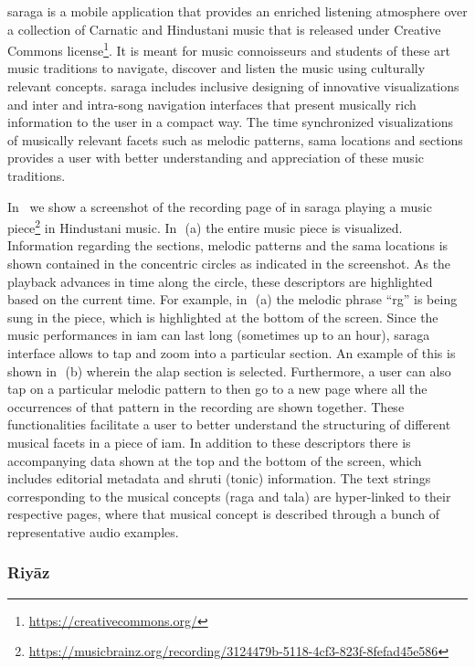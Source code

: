 \Gls{saraga} is a mobile application that provides an enriched listening atmosphere over a collection of Carnatic and Hindustani music that is released under Creative Commons license\footnote{\url{https://creativecommons.org/}}. It is meant for music connoisseurs and students of these art music traditions to navigate, discover and listen the music using culturally relevant concepts. \gls{saraga} includes inclusive designing of innovative visualizations and inter and intra-song navigation interfaces that present musically rich information to the user in a compact way. The time synchronized visualizations of musically relevant facets such as melodic patterns, \gls{sama} locations and sections provides a user with better understanding and appreciation of these music traditions.

In~ we show a screenshot of the recording page of in \gls{saraga} playing a music piece\footnote{\url{https://musicbrainz.org/recording/3124479b-5118-4cf3-823f-8fefad45e586}} in Hindustani music. In~\,(a) the entire music piece is visualized. Information regarding the sections, melodic patterns and the \gls{sama} locations is shown contained in the concentric circles as indicated in the screenshot. As the playback advances in time along the circle, these descriptors are highlighted based on the current time. For example, in~\,(a) the melodic phrase ``rg'' is being sung in the piece, which is highlighted at the bottom of the screen. Since the music performances in \gls{iam} can last long (sometimes up to an hour), \gls{saraga} interface allows to tap and zoom into a particular section. An example of this is shown in~\,(b) wherein the \gls{alap} section is selected. Furthermore, a user can also tap on a particular melodic pattern to then go to a new page where all the occurrences of that pattern in the recording are shown together. These functionalities facilitate a user to better understand the structuring of different musical facets in a piece of \gls{iam}. In addition to these descriptors there is accompanying data shown at the top and the bottom of the screen, which includes editorial metadata and \gls{shruti} (tonic) information. The text strings corresponding to the musical concepts (\gls{raga} and \gls{tala}) are hyper-linked to their respective pages, where that musical concept is described through a bunch of representative audio examples. 


\subsubsection{Riy\={a}z}
\label{sec:riyaz}

